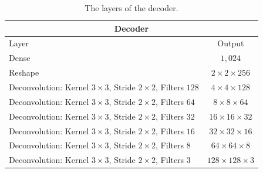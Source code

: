 \begin{center}
    \begin{table}[H]
        \centering
        \begin{tabular}{ | l | c | }
            \multicolumn{2}{c}{Decoder} \\ \hline
            Layer & Output\\ \hline
            Dense                                                                   & $1,024$                   \\
            Reshape                                                                 & $2\times 2\times    256$  \\
            Deconvolution: Kernel $3\times3$, Stride $2\times2$, Filters $128$      & $4\times 4\times    128$  \\  
            Deconvolution: Kernel $3\times3$, Stride $2\times2$, Filters $64 $      & $8\times 8\times    64 $  \\
            Deconvolution: Kernel $3\times3$, Stride $2\times2$, Filters $32 $      & $16\times 16\times  32 $  \\
            Deconvolution: Kernel $3\times3$, Stride $2\times2$, Filters $16 $      & $32\times 32\times  16 $  \\
            Deconvolution: Kernel $3\times3$, Stride $2\times2$, Filters $8  $      & $64\times 64\times  8  $  \\
            Deconvolution: Kernel $3\times3$, Stride $2\times2$, Filters $3  $      & $128\times 128\times3  $  \\
            \hline
        \end{tabular} 
        \caption{The layers of the decoder.}
    \end{table}
\end{center}


